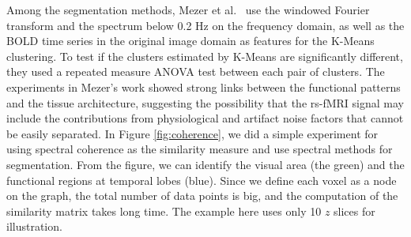 Among the segmentation methods, Mezer et al.~\cite{mezer2009cluster} use the
windowed Fourier transform and the spectrum below 0.2 Hz on the frequency
domain, as well as the BOLD time series in the original image domain as features
for the K-Means clustering. To test if the clusters estimated by K-Means are
significantly different, they used a repeated measure ANOVA test between each
pair of clusters. The experiments in Mezer's work showed strong links between
the functional patterns and the tissue architecture, suggesting the possibility
that the rs-fMRI signal may include the contributions from physiological and
artifact noise factors that cannot be easily separated. In Figure
\ref{fig:coherence}, we did a simple experiment for using spectral coherence as
the similarity measure and use spectral methods for segmentation. From the
figure, we can identify the visual area (the green) and the functional regions
at temporal lobes (blue). Since we define each voxel as a node on the graph, the
total number of data points is big, and the computation of the similarity matrix
takes long time. The example here uses only 10 $z$ slices for illustration.


